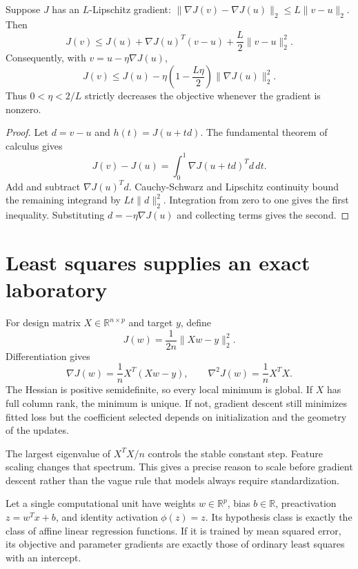\begin{theorem}
\label{thm:descent-lemma}
Suppose $J$ has an $L$-Lipschitz gradient:
$\lVert\nabla J(v)-\nabla J(u)\rVert_2\le L\lVert v-u\rVert_2$. Then
\[
J(v)\leq J(u)+\nabla J(u)^T(v-u)+\frac{L}{2}\lVert v-u\rVert_2^2.
\]
Consequently, with $v=u-\eta\nabla J(u)$,
\[
J(v)\le J(u)-\eta\left(1-\frac{L\eta}{2}\right)
\lVert\nabla J(u)\rVert_2^2.
\]
Thus $0<\eta<2/L$ strictly decreases the objective whenever the gradient is
nonzero.
\end{theorem}

\begin{proof}
Let $d=v-u$ and $h(t)=J(u+td)$. The fundamental theorem of calculus gives
\[
J(v)-J(u)=\int_0^1\nabla J(u+td)^Td\,dt.
\]
Add and subtract $\nabla J(u)^Td$. Cauchy-Schwarz and Lipschitz continuity
bound the remaining integrand by $Lt\lVert d\rVert_2^2$. Integration from zero
to one gives the first inequality. Substituting
$d=-\eta\nabla J(u)$ and collecting terms gives the second.
\end{proof}

\section{Least squares supplies an exact laboratory}

For design matrix $X\in\mathbb{R}^{n\times p}$ and target $y$, define
\[
J(w)=\frac{1}{2n}\lVert Xw-y\rVert_2^2.
\]
Differentiation gives
\[
\nabla J(w)=\frac1nX^T(Xw-y),
\qquad
\nabla^2J(w)=\frac1nX^TX.
\]
The Hessian is positive semidefinite, so every local minimum is global. If $X$
has full column rank, the minimum is unique. If not, gradient descent still
minimizes fitted loss but the coefficient selected depends on initialization
and the geometry of the updates.

The largest eigenvalue of $X^TX/n$ controls the stable constant step. Feature
scaling changes that spectrum. This gives a precise reason to scale before
gradient descent rather than the vague rule that models always require
standardization.

\begin{theorem}
\label{thm:identity-neuron}
Let a single computational unit have weights $w\in\mathbb{R}^p$, bias
$b\in\mathbb{R}$, preactivation $z=w^Tx+b$, and identity activation
$\phi(z)=z$. Its hypothesis class is exactly the class of affine linear
regression functions. If it is trained by mean squared error, its objective and
parameter gradients are exactly those of ordinary least squares with an
intercept.
\end{theorem}

